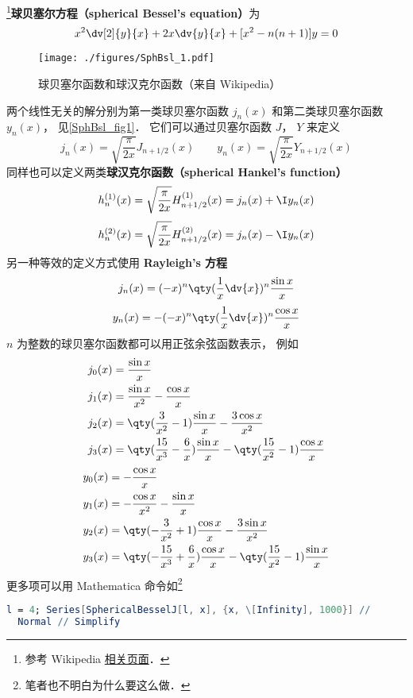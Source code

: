 

\footnote{参考 Wikipedia \href{https://en.wikipedia.org/wiki/Bessel_function}{相关页面}．}\textbf{球贝塞尔方程（spherical Bessel's equation）}为
\begin{equation}
x^2 \dv[2]{y}{x} + 2x \dv{y}{x} + [x^2 - n(n + 1)]y = 0
\end{equation}
\begin{figure}[ht]
\centering
\texttt{[image: ./figures/SphBsl\_1.pdf]}
\caption{球贝塞尔函数和球汉克尔函数（来自 Wikipedia）} \label{SphBsl_fig1}
\end{figure}
两个线性无关的解分别为第一类球贝塞尔函数 $j_n(x)$ 和第二类球贝塞尔函数 $y_n(x)$， 见\autoref{SphBsl_fig1}． 它们可以通过贝塞尔函数 $J$， $Y$ 来定义
\begin{equation}
j_n(x) = \sqrt{\frac{\pi}{2x}} J_{n+1/2}(x)
\qquad
y_n(x) = \sqrt{\frac{\pi}{2x}} Y_{n+1/2}(x)
\end{equation}
同样也可以定义两类\textbf{球汉克尔函数（spherical Hankel's function）}
\begin{equation}
h_n^{(1)}(x) = \sqrt {\frac{\pi }{2x}} H_{n+1/2}^{(1)}(x) = j_n(x) + \I y_n(x)
\end{equation}
\begin{equation}
h_n^{(2)}(x) = \sqrt{\frac{\pi }{2x}} H_{n+1/2}^{(2)}(x) = j_n(x) - \I y_n(x)
\end{equation}
另一种等效的定义方式使用 \textbf{Rayleigh's 方程}
\begin{equation}
j_n(x) = (-x)^n \qty(\frac{1}{x} \dv{x})^n \frac{\sin x}{x}
\end{equation}
\begin{equation}
y_n(x) = -(-x)^n \qty(\frac{1}{x} \dv{x})^n \frac{\cos x}{x}
\end{equation}
$n$ 为整数的球贝塞尔函数都可以用正弦余弦函数表示， 例如
\begin{align}
&j_0(x) = \frac{\sin x}{x}\\
&j_1(x) = \frac{\sin x}{x^2} - \frac{\cos x}{x}\\
&j_2(x) = \qty(\frac{3}{x^2} - 1) \frac{\sin x}{x} - \frac{3\cos x}{x^2}\\
&j_3(x) = \qty(\frac{15}{x^3} - \frac{6}{x})\frac{\sin x}{x} - \qty(\frac{15}{x^2}-1)\frac{\cos x}{x}
\end{align}
\begin{align}
&y_0(x) = -\frac{\cos x}{x}\\
&y_1(x) = -\frac{\cos x}{x^2} - \frac{\sin x}{x}\\
&y_2(x) = \qty(-\frac{3}{x^2}+1)\frac{\cos x}{x} - \frac{3\sin x}{x^2}\\
&y_3(x) = \qty(-\frac{15}{x^3}+\frac{6}{x}) \frac{\cos x}{x} - \qty(\frac{15}{x^2} - 1)\frac{\sin x}{x}
\end{align}
更多项可以用 Mathematica 命令如\footnote{笔者也不明白为什么要这么做．}
\begin{lstlisting}[language=Mathematica]
l = 4; Series[SphericalBesselJ[l, x], {x, \[Infinity], 1000}] // 
  Normal // Simplify
\end{lstlisting}

